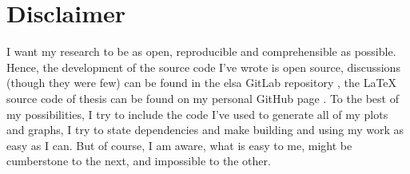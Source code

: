 \section{Disclaimer}

I want my research to be as open, reproducible and comprehensible as possible. Hence, the
development of the source code I've wrote is open source, discussions (though they were few) can be
found in the elsa GitLab repository , the \LaTeX{} source code of thesis
can be found on my personal GitHub page . To the best of my
possibilities, I try to include the code I've used to generate all of my plots and graphs, I try to
state dependencies and make building and using my work as easy as I can. But of course, I am aware,
what is easy to me, might be cumberstone to the next, and impossible to the other.


